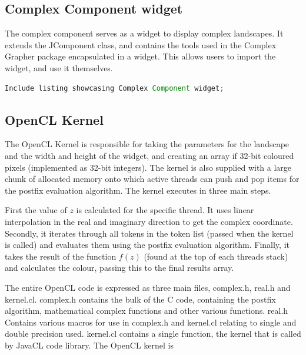 \documentclass{article}
\begin{document}
			\subsection{Complex Component widget}
				The complex component serves as a widget to display complex landscapes. It extends the JComponent class, and contains the tools used in the Complex Grapher package encapsulated in a widget. This allows users to import the widget, and use it themselves.
				
				\begin{lstlisting}[language=Java]
					Include listing showcasing Complex Component widget;
				\end{lstlisting}
			
			\subsection{OpenCL Kernel}
				The OpenCL Kernel is responsible for taking the parameters for the landscape and the width and height of the widget, and creating an array if 32-bit coloured pixels (implemented as 32-bit integers). The kernel is also supplied with a large chunk of allocated memory onto which active threads can push and pop items for the postfix evaluation algorithm. The kernel executes in three main steps. 
				
				First the value of $z$ is calculated for the specific thread. It uses linear interpolation in the real and imaginary direction to get the complex coordinate. Secondly, it iterates through all tokens in the token list (passed when the kernel is called) and evaluates them using the postfix evaluation algorithm. Finally, it takes the result of the function $f(z)$ (found at the top of each threads stack) and calculates the colour, passing this to the final results array.
				
				The entire OpenCL code is expressed as three main files, complex.h, real.h and kernel.cl. complex.h contains the bulk of the C code, containing the postfix algorithm, mathematical complex functions and other various functions. real.h Contains various macros for use in complex.h and kernel.cl relating to single and double precision used. kernel.cl contains a single function, the kernel that is called by JavaCL code library. The OpenCL kernel is\\
				
				
			
\end{document}
